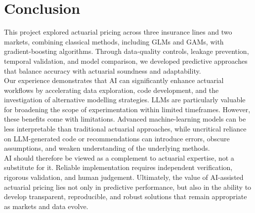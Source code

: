 
\section{Conclusion}

This project explored actuarial pricing across three insurance lines and two markets, combining classical methods, including GLMs and GAMs, with gradient-boosting algorithms. Through data-quality controls, leakage prevention, temporal validation, and model comparison, we developed predictive approaches that balance accuracy with actuarial soundness and adaptability.\\

Our experience demonstrates that AI can significantly enhance actuarial workflows by accelerating data exploration, code development, and the investigation of alternative modelling strategies. LLMs are particularly valuable for broadening the scope of experimentation within limited timeframes. However, these benefits come with limitations. Advanced machine-learning models can be less interpretable than traditional actuarial approaches, while uncritical reliance on LLM-generated code or recommendations can introduce errors, obscure assumptions, and weaken understanding of the underlying methods.\\

AI should therefore be viewed as a complement to actuarial expertise, not a substitute for it. Reliable implementation requires independent verification, rigorous validation, and human judgement. Ultimately, the value of AI-assisted actuarial pricing lies not only in predictive performance, but also in the ability to develop transparent, reproducible, and robust solutions that remain appropriate as markets and data evolve.
